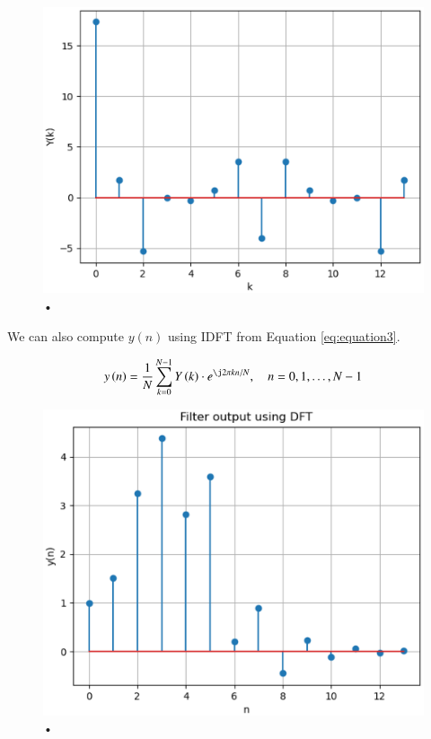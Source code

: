 \documentclass[journal,12pt,twocolumn]{IEEEtran}
\begin{document}
\begin{figure}[!ht]
  \includegraphics[width=\columnwidth]{./figs/ee18btech11017_fig1.eps}
  \caption{•}
  \label{fig:fig1}
\end{figure}

We can also compute $y(n)$ using IDFT from Equation \ref{eq:equation3}.

\begin{equation}
 y\brak{n}={\frac {1}{N}}\sum _{k=0}^{N-1}Y\brak{k}\cdot e^{\j 2\pi kn/N},\quad n = 0,1,\dots, N-1
\label{eq:equation3} 
\end{equation}

\begin{figure}[!ht]
  \includegraphics[width=\columnwidth]{./figs/ee18btech11017_fig2.eps}
  \caption{•}
  \label{fig:fig2}
\end{figure}
\end{document}
